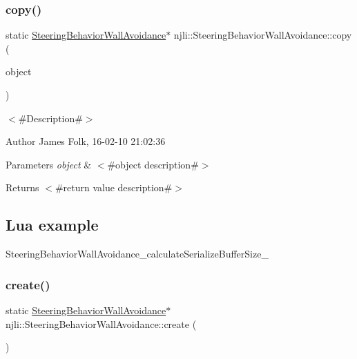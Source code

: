 \subsubsection{\texorpdfstring{copy()}{copy()}}
{\footnotesize\ttfamily static \mbox{\hyperlink{classnjli_1_1_steering_behavior_wall_avoidance}{Steering\+Behavior\+Wall\+Avoidance}}$\ast$ njli\+::\+Steering\+Behavior\+Wall\+Avoidance\+::copy (\begin{DoxyParamCaption}\item[{const \mbox{\hyperlink{classnjli_1_1_steering_behavior_wall_avoidance}{Steering\+Behavior\+Wall\+Avoidance}} \&}]{object }\end{DoxyParamCaption})\hspace{0.3cm}{\ttfamily [static]}}



$<$\#\+Description\#$>$ 

\begin{DoxyAuthor}{Author}
James Folk, 16-\/02-\/10 21\+:02\+:36
\end{DoxyAuthor}

\begin{DoxyParams}{Parameters}
{\em object} & $<$\#object description\#$>$\\
\hline
\end{DoxyParams}
\begin{DoxyReturn}{Returns}
$<$\#return value description\#$>$
\end{DoxyReturn}
\hypertarget{classnjli_1_1_steering_behavior_wander_ex1}{}\subsection{Lua example}\label{classnjli_1_1_steering_behavior_wander_ex1}

\begin{DoxyCodeInclude}
\end{DoxyCodeInclude}
Steering\+Behavior\+Wall\+Avoidance\+\_\+calculate\+Serialize\+Buffer\+Size\+\_\+ \mbox{\label{classnjli_1_1_steering_behavior_wall_avoidance_aa7933927d90b5a7d016a930bd2c2f53d}} 
\subsubsection{\texorpdfstring{create()}{create()}\hspace{0.1cm}{\footnotesize\ttfamily [1/2]}}
{\footnotesize\ttfamily static \mbox{\hyperlink{classnjli_1_1_steering_behavior_wall_avoidance}{Steering\+Behavior\+Wall\+Avoidance}}$\ast$ njli\+::\+Steering\+Behavior\+Wall\+Avoidance\+::create (\begin{DoxyParamCaption}{ }\end{DoxyParamCaption})\hspace{0.3cm}{\ttfamily [static]}}



